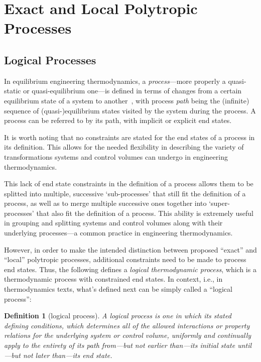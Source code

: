 \documentclass[fleqn,11pt]{SelfArx}
\newtheorem{definition}{Definition}
\begin{document}
\section{Exact and Local Polytropic Processes}

    \subsection{Logical Processes}

    In equilibrium engineering thermodynamics, a \emph{process}---more properly  a  quasi-static
    or quasi-equilibrium one---is defined in terms of changes from a certain  equilibrium  state
    of a system to another~\cite{2013-CengelYA+BolesMA-AMGH}, with process \emph{path} being the
    (infinite) sequence of (quasi-)equilibrium states visited by the system during the  process.
    A process can be referred to by its path, with implicit or explicit end states.

    It is worth noting that no constraints are stated for the end states of  a  process  in  its
    definition.  This  allows  for  the  needed  flexibility  in  describing  the   variety   of
    transformations systems and control volumes can undergo in engineering thermodynamics.

    This lack of end state constraints in the definition of a process allows them to be splitted
    into multiple, successive `sub-processes' that still fit the definition  of  a  process,  as
    well as to merge multiple successive ones together into `super-processes' that also fit  the
    definition of a process. This ability is extremely useful in grouping and splitting  systems
    and control volumes along with their underlying processes---a common practice in engineering
    thermodynamics.

    However, in order to make the intended distinction between proposed ``exact'' and  ``local''
    polytropic processes, additional constraints need to be made to process  end  states.  Thus,
    the following defines a \emph{logical  thermodynamic  process},  which  is  a  thermodynamic
    process with constrained end states. In  context,  i.e.,  in  thermodynamics  texts,  what's
    defined next can be simply called a ``logical process'':

    \begin{definition}[logical process]\label{def:logical.proc}
        A logical process is one in which its stated defining conditions, which  determines  all
        of the allowed interactions or property relations for the underlying system  or  control
        volume, uniformly and continually apply to the  entirety  of  its  path  from---but  not
        earlier than---its initial state until---but not later than---its end state.
    \end{definition}
\end{document}
